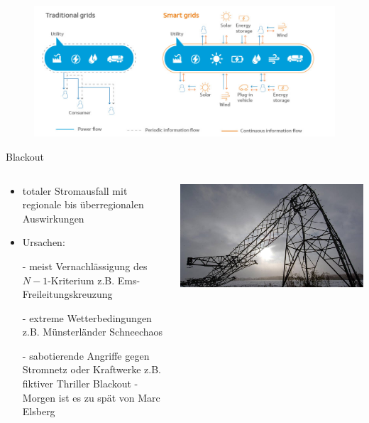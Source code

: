 \documentclass[aspectratio=1610, professionalfonts, 9pt]{beamer}
\begin{document}
\begin{frame}
\begin{figure}
  \includegraphics[width=1\textwidth]{images/smart-grid.jpg}
\end{figure}
\end{frame}

\begin{frame}{Blackout}
  \begin{columns}
\begin{column}{0.5\textwidth}
\begin{itemize}
\item totaler Stromausfall mit regionale bis überregionalen Auswirkungen
\item Ursachen:
\item[-]meist Vernachlässigung des $N-1$-Kriterium z.B. Ems-Freileitungskreuzung
\item[-]extreme Wetterbedingungen z.B. Münsterländer Schneechaos
\item[-]sabotierende Angriffe gegen Stromnetz oder Kraftwerke
   z.B. fiktiver Thriller Blackout - Morgen ist es zu spät von Marc Elsberg
\end{itemize}
\end{column}
\begin{column}{0.5\textwidth}
  \includegraphics[width=1\textwidth]{images/stromausfall-deutschland-muensterland.jpg}\\
\end{column}
\end{columns}
\end{frame}
\end{document}
